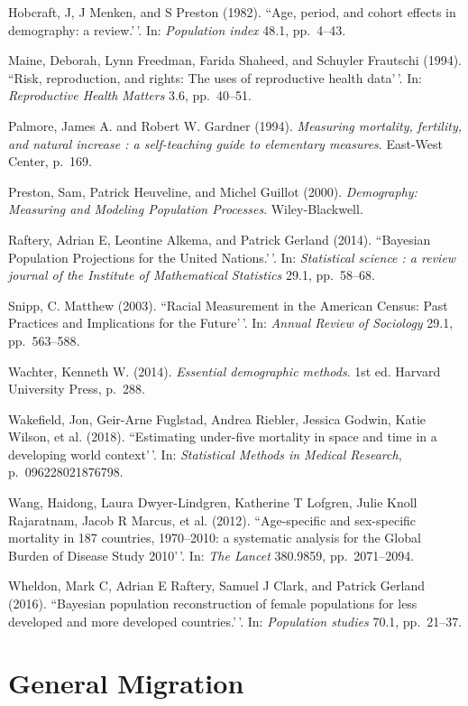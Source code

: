 \documentclass[11pt,]{article}
\begin{document}
Hobcraft, J, J Menken, and S Preston (1982). ``Age, period, and cohort
effects in demography: a review.'\,'. In: \emph{Population index} 48.1,
pp.~4--43.

Maine, Deborah, Lynn Freedman, Farida Shaheed, and Schuyler Frautschi
(1994). ``Risk, reproduction, and rights: The uses of reproductive
health data'\,'. In: \emph{Reproductive Health Matters} 3.6, pp.~40--51.

Palmore, James A. and Robert W. Gardner (1994).
\emph{Measuring mortality, fertility, and natural increase : a self-teaching guide to elementary measures}.
East-West Center, p.~169.

Preston, Sam, Patrick Heuveline, and Michel Guillot (2000).
\emph{Demography: Measuring and Modeling Population Processes}.
Wiley-Blackwell.

Raftery, Adrian E, Leontine Alkema, and Patrick Gerland (2014).
``Bayesian Population Projections for the United Nations.'\,'. In:
\emph{Statistical science : a review journal of the Institute of Mathematical Statistics}
29.1, pp.~58--68.

Snipp, C. Matthew (2003). ``Racial Measurement in the American Census:
Past Practices and Implications for the Future'\,'. In:
\emph{Annual Review of Sociology} 29.1, pp.~563--588.

Wachter, Kenneth W. (2014). \emph{Essential demographic methods}. 1st
ed. Harvard University Press, p.~288.

Wakefield, Jon, Geir-Arne Fuglstad, Andrea Riebler, Jessica Godwin,
Katie Wilson, et al. (2018). ``Estimating under-five mortality in space
and time in a developing world context'\,'. In:
\emph{Statistical Methods in Medical Research}, p.~096228021876798.

Wang, Haidong, Laura Dwyer-Lindgren, Katherine T Lofgren, Julie Knoll
Rajaratnam, Jacob R Marcus, et al. (2012). ``Age-specific and
sex-specific mortality in 187 countries, 1970--2010: a systematic
analysis for the Global Burden of Disease Study 2010'\,'. In:
\emph{The Lancet} 380.9859, pp.~2071--2094.

Wheldon, Mark C, Adrian E Raftery, Samuel J Clark, and Patrick Gerland
(2016). ``Bayesian population reconstruction of female populations for
less developed and more developed countries.'\,'. In:
\emph{Population studies} 70.1, pp.~21--37.

\hypertarget{general-migration}{%
\section{General Migration}\label{general-migration}}
\end{document}

